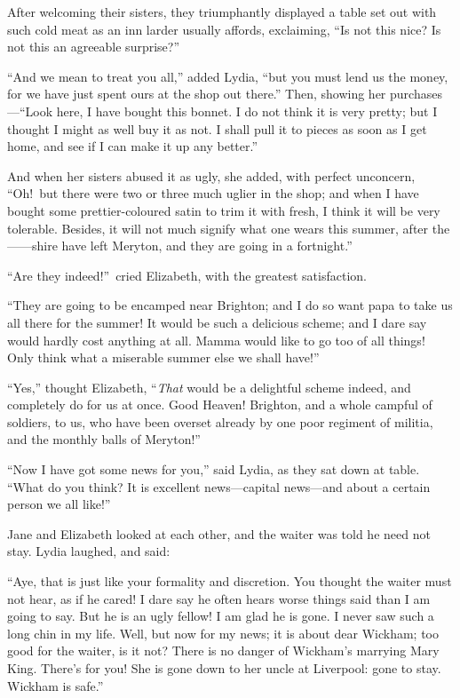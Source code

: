 \documentclass[12pt,english]{book}
\begin{document}
After welcoming their sisters, they triumphantly displayed a table
set out with such cold meat as an inn larder usually affords, exclaiming,
{}``Is not this nice? Is not this an agreeable surprise?''\ 

{}``And we mean to treat you all,'' added Lydia, {}``but you must
lend us the money, for we have just spent ours at the shop out there.''
Then, showing her purchases\mbox{---}{}``Look here, I have bought
this bonnet. I do not think it is very pretty; but I thought I might
as well buy it as not. I shall pull it to pieces as soon as I get
home, and see if I can make it up any better.''

And when her sisters abused it as ugly, she added, with perfect unconcern,
{}``Oh!\ but there were two or three much uglier in the shop; and
when I have bought some prettier-coloured satin to trim it with fresh,
I think it will be very tolerable. Besides, it will not much signify
what one wears this summer, after the \mbox{------}shire have left
Meryton, and they are going in a fortnight.''

{}``Are they indeed!''\ cried Elizabeth, with the greatest satisfaction.

{}``They are going to be encamped near Brighton; and I do so want
papa to take us all there for the summer! It would be such a delicious
scheme; and I dare say would hardly cost anything at all. Mamma would
like to go too of all things! Only think what a miserable summer else
we shall have!''\ 

{}``Yes,'' thought Elizabeth, {}``\textit{That} would be a delightful
scheme indeed, and completely do for us at once. Good Heaven! Brighton,
and a whole campful of soldiers, to us, who have been overset already
by one poor regiment of militia, and the monthly balls of Meryton!''\ 

{}``Now I have got some news for you,'' said Lydia, as they sat
down at table. {}``What do you think? It is excellent news\mbox{---}capital
news\mbox{---}and about a certain person we all like!''\ 

Jane and Elizabeth looked at each other, and the waiter was told he
need not stay. Lydia laughed, and said:

{}``Aye, that is just like your formality and discretion. You thought
the waiter must not hear, as if he cared! I dare say he often hears
worse things said than I am going to say. But he is an ugly fellow!
I am glad he is gone. I never saw such a long chin in my life. Well,
but now for my news; it is about dear Wickham; too good for the waiter,
is it not? There is no danger of Wickham's marrying Mary King. There's
for you! She is gone down to her uncle at Liverpool: gone to stay.
Wickham is safe.''
\end{document}
